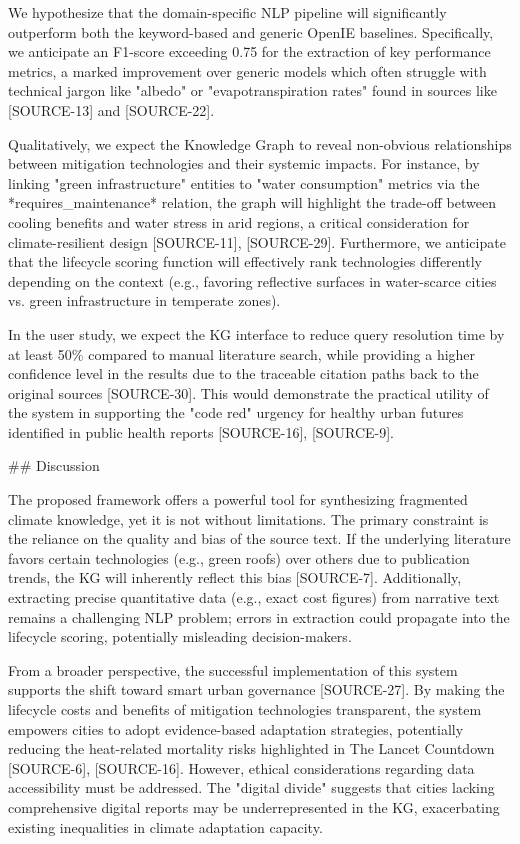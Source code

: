 \documentclass{article}
\begin{document}
We hypothesize that the domain-specific NLP pipeline will significantly outperform both the keyword-based and generic OpenIE baselines. Specifically, we anticipate an F1-score exceeding 0.75 for the extraction of key performance metrics, a marked improvement over generic models which often struggle with technical jargon like "albedo" or "evapotranspiration rates" found in sources like [SOURCE-13] and [SOURCE-22].

Qualitatively, we expect the Knowledge Graph to reveal non-obvious relationships between mitigation technologies and their systemic impacts. For instance, by linking "green infrastructure" entities to "water consumption" metrics via the *requires_maintenance* relation, the graph will highlight the trade-off between cooling benefits and water stress in arid regions, a critical consideration for climate-resilient design [SOURCE-11], [SOURCE-29]. Furthermore, we anticipate that the lifecycle scoring function will effectively rank technologies differently depending on the context (e.g., favoring reflective surfaces in water-scarce cities vs. green infrastructure in temperate zones).

In the user study, we expect the KG interface to reduce query resolution time by at least 50\% compared to manual literature search, while providing a higher confidence level in the results due to the traceable citation paths back to the original sources [SOURCE-30]. This would demonstrate the practical utility of the system in supporting the "code red" urgency for healthy urban futures identified in public health reports [SOURCE-16], [SOURCE-9].

\#\# Discussion

The proposed framework offers a powerful tool for synthesizing fragmented climate knowledge, yet it is not without limitations. The primary constraint is the reliance on the quality and bias of the source text. If the underlying literature favors certain technologies (e.g., green roofs) over others due to publication trends, the KG will inherently reflect this bias [SOURCE-7]. Additionally, extracting precise quantitative data (e.g., exact cost figures) from narrative text remains a challenging NLP problem; errors in extraction could propagate into the lifecycle scoring, potentially misleading decision-makers.

From a broader perspective, the successful implementation of this system supports the shift toward smart urban governance [SOURCE-27]. By making the lifecycle costs and benefits of mitigation technologies transparent, the system empowers cities to adopt evidence-based adaptation strategies, potentially reducing the heat-related mortality risks highlighted in The Lancet Countdown [SOURCE-6], [SOURCE-16]. However, ethical considerations regarding data accessibility must be addressed. The "digital divide" suggests that cities lacking comprehensive digital reports may be underrepresented in the KG, exacerbating existing inequalities in climate adaptation capacity.
\end{document}
